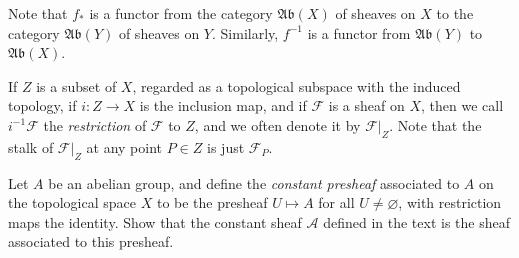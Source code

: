 {\smallskip
Note that $f_*$ is a functor from the category $\mathfrak{Ab}(X)$ of sheaves on $X$ to the category $\mathfrak{Ab}(Y)$ of sheaves on $Y$. Similarly, $f^{-1}$ is a functor from $\mathfrak{Ab}(Y)$ to $\mathfrak{Ab}(X)$.

\Dfn If $Z$ is a subset of $X$, regarded as a topological subspace with the induced topology, if $i\colon Z\to X$ is the inclusion map, and if $\mathcal F$ is a sheaf on $X$, then we call $i^{-1}\mathcal F$ the \emph{restriction} of $\mathcal F$ to $Z$, and we often denote it by $\mathcal F|_Z$. Note that the stalk of $\mathcal F|_Z$ at any point $P\in Z$ is just $\mathcal F_P$.

\Exercises
{\fontsize{9}{10.5}\selectfont
\begin{description}[leftmargin=2.4em,labelindent=0pt,nosep]
\item[\hypertarget{ex-II-1.1}{}\textbf{1.1.}] Let $A$ be an abelian group, and define the \emph{constant presheaf} associated to $A$ on the topological space $X$ to be the presheaf $U\mapsto A$ for all $U\ne\varnothing$, with restriction maps the identity. Show that the constant sheaf $\mathcal A$ defined in the text is the sheaf associated to this presheaf.
\end{description}}
}
